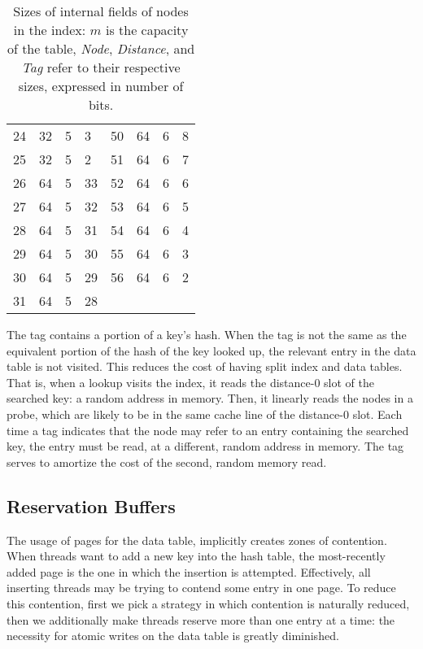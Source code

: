 \begin{table}
\begin{tabular}{llll|llll}
                  24       & 32   & 5        & 3   & 50       & 64   & 6        & 8   \\
                  25       & 32   & 5        & 2   & 51       & 64   & 6        & 7   \\
                  26       & 64   & 5        & 33  & 52       & 64   & 6        & 6   \\
                  27       & 64   & 5        & 32  & 53       & 64   & 6        & 5   \\
                  28       & 64   & 5        & 31  & 54       & 64   & 6        & 4   \\
                  29       & 64   & 5        & 30  & 55       & 64   & 6        & 3   \\
                  30       & 64   & 5        & 29  & 56       & 64   & 6        & 2   \\
                  31 & 64 & 5 & 28 & \\
    \end{tabular}
    \caption{Sizes of internal fields of nodes in the index: $m$ is the capacity of the table, \emph{Node}, \emph{Distance}, and \emph{Tag} refer to their respective sizes, expressed in number of bits.}
    \label{tab:nodes}
\end{table}

The tag contains a portion of a key's hash.
When the tag is not the same as the equivalent portion of the hash of the key looked up, the relevant entry in the data table is not visited.
This reduces the cost of having split index and data tables.
That is, when a lookup visits the index, it reads the distance-0 slot of the searched key: a random address in memory.
Then, it linearly reads the nodes in a probe, which are likely to be in the same cache line of the distance-0 slot.
Each time a tag indicates that the node may refer to an entry containing the searched key, the entry must be read, at a different, random address in memory.
The tag serves to amortize the cost of the second, random memory read.

\subsection{Reservation Buffers}\label{subsec:reservation-buffers}

The usage of pages for the data table, implicitly creates zones of contention.
When threads want to add a new key into the hash table, the most-recently added page is the one in which the insertion is attempted.
Effectively, all inserting threads may be trying to contend some entry in one page.
To reduce this contention, first we pick a strategy in which contention is naturally reduced, then we additionally make threads reserve more than one entry at a time: the necessity for atomic writes on the data table is greatly diminished.

